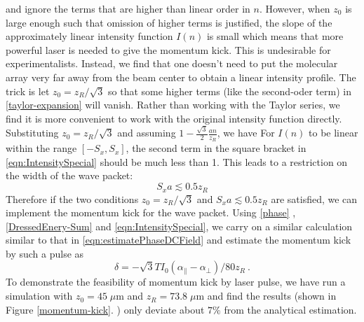 and ignore the terms that are higher than linear order in $n$. However, when $z_0$ is large enough such that
 omission of higher terms is justified, the slope of the approximately linear intensity function $I(n)$ is small which
 means that more powerful laser is needed to give the momentum kick. This is undesirable for experimentalists.
Instead, we find that one doesn’t need to put the molecular array very far away from the beam center
to obtain a linear intensity profile. The trick is let $z_0 = z_R /\sqrt{3}$ so that some higher terms (like the 
second-oder term) in \autoref{taylor-expansion} will vanish. Rather than working with the
Taylor series, we find it is more convenient to work with the original intensity function directly. Substituting
$z_0 = z_R /\sqrt{3}$ and assuming $1 - \frac{\sqrt{3}}{2} \frac{a n}{z_R}$, we have
For $I(n)$ to be linear within the range $[ - S_x , S_x ]$, the second term in the square bracket in
 \autoref{eqn:IntensitySpecial} should be much less than 1.
This leads to a restriction on the width of the wave packet:
\begin{equation}
S_x a\lesssim 0.5 z_R
\end{equation}
Therefore if the two conditions $z_0 = z_R/\sqrt{3}$ and $S_x
a\lesssim 0.5 z_R$ are satisfied, we can implement the momentum
kick for the wave packet. Using \autoref{phase} ,
\autoref{DressedEnery-Sum} and \autoref{eqn:IntensitySpecial}, we carry on a similar calculation similar to that in
 \autoref{eqn:estimatePhaseDCField} and estimate the momentum kick by such a pulse as 
\begin{equation}
\delta = -\sqrt{3}T I_{0} (\alpha_{\|}-\alpha_\perp) / 80 z_R \ . \label{Kick-AC}
\end{equation}
To demonstrate the feasibility of momentum kick by laser
pulse, we have run a simulation with $z_0 = 45\; \mu$m and
$z_R=73.8\; \mu$m and find the results (shown in Figure
\ref{momentum-kick}. ) only deviate about $7\%$ from the
analytical estimation.



